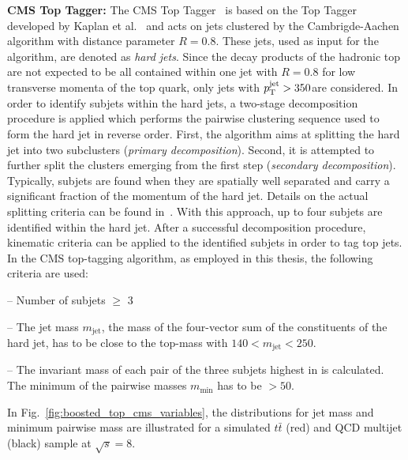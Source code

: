 \begin{description}
 \item \textbf{CMS Top Tagger:} The CMS Top Tagger~\cite{CMS-PAS-JME-09-001} is based on the Top Tagger developed by Kaplan et al.~\cite{Kaplan:2008ie} and acts on jets clustered by the Cambrigde-Aachen algorithm with distance parameter $R = 0.8$. These jets, used as input for the algorithm, are denoted as \textit{hard jets}. Since the decay products of the hadronic top are not expected to be all contained within one jet with $R = 0.8$ for low transverse momenta of the top quark, only jets with $p_{\text{T}}^\mathrm{jet} > 350$\gev are considered. In order to identify subjets within the hard jets, a two-stage decomposition procedure is applied which performs the pairwise clustering sequence used to form the hard jet in reverse order. First, the algorithm aims at splitting the hard jet into two subclusters (\textit{primary decomposition}). Second, it is attempted to further split the clusters emerging from the first step (\textit{secondary decomposition}). Typically, subjets are found when they are spatially well separated and carry a significant fraction of the momentum of the hard jet. Details on the actual splitting criteria can be found in~\cite{CMS:2014fya}. With this approach, up to four subjets are identified within the hard jet. After a successful decomposition procedure, kinematic criteria can be applied to the identified subjets in order to tag top jets. In the CMS top-tagging algorithm, as employed in this thesis, the following criteria are used:
\begin{description}
 \item -- Number of subjets $\ge$ 3
 \item -- The jet mass $m_{\mathrm{jet}}$, \ie the mass of the four-vector sum of the constituents of the hard jet, has to be close to the top-mass with $140 < m_{\mathrm{jet}} < 250$\gev.
 \item -- The invariant mass of each pair of the three subjets highest in \pt is calculated. The minimum of the pairwise masses $m_{\mathrm{min}}$ has to be $ > 50$\gev.
\end{description}
In Fig.~\ref{fig:boosted_top_cms_variables}, the distributions for jet mass and minimum pairwise mass are illustrated for a simulated $t\bar{t}$ (red) and QCD multijet (black) sample at $\sqrt{s} = 8$\tev. 

\end{description}

